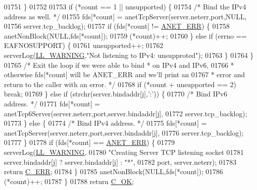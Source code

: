 \begin{DoxyCode}
{{{{{{{{{{{{{{{{{{{{{{{{{01751             \}
01752 
01753             \textcolor{keywordflow}{if} (*count == 1 || unsupported) \{
01754                 \textcolor{comment}{/* Bind the IPv4 address as well. */}
01755                 fds[*count] = anetTcpServer(server.neterr,port,NULL,
01756                     server.tcp\_backlog);
01757                 \textcolor{keywordflow}{if} (fds[*count] != \hyperlink{anet_8h_a0697b7774a7e0f4ef141839fe93536fe}{ANET\_ERR}) \{
01758                     anetNonBlock(NULL,fds[*count]);
01759                     (*count)++;
01760                 \} \textcolor{keywordflow}{else} \textcolor{keywordflow}{if} (errno == EAFNOSUPPORT) \{
01761                     unsupported++;
01762                     serverLog(\hyperlink{server_8h_a31229b9334bba7d6be2a72970967a14b}{LL\_WARNING},\textcolor{stringliteral}{"Not listening to IPv4: unsupproted"});
01763                 \}
01764             \}
01765             \textcolor{comment}{/* Exit the loop if we were able to bind * on IPv4 and IPv6,}
01766 \textcolor{comment}{             * otherwise fds[*count] will be ANET\_ERR and we'll print an}
01767 \textcolor{comment}{             * error and return to the caller with an error. */}
01768             \textcolor{keywordflow}{if} (*count + unsupported == 2) \textcolor{keywordflow}{break};
01769         \} \textcolor{keywordflow}{else} \textcolor{keywordflow}{if} (strchr(server.bindaddr[j],\textcolor{stringliteral}{':'})) \{
01770             \textcolor{comment}{/* Bind IPv6 address. */}
01771             fds[*count] = anetTcp6Server(server.neterr,port,server.bindaddr[j],
01772                 server.tcp\_backlog);
01773         \} \textcolor{keywordflow}{else} \{
01774             \textcolor{comment}{/* Bind IPv4 address. */}
01775             fds[*count] = anetTcpServer(server.neterr,port,server.bindaddr[j],
01776                 server.tcp\_backlog);
01777         \}
01778         \textcolor{keywordflow}{if} (fds[*count] == \hyperlink{anet_8h_a0697b7774a7e0f4ef141839fe93536fe}{ANET\_ERR}) \{
01779             serverLog(\hyperlink{server_8h_a31229b9334bba7d6be2a72970967a14b}{LL\_WARNING},
01780                 \textcolor{stringliteral}{"Creating Server TCP listening socket %
01781                 server.bindaddr[j] ? server.bindaddr[j] : \textcolor{stringliteral}{"*"},
01782                 port, server.neterr);
01783             \textcolor{keywordflow}{return} \hyperlink{server_8h_af98ac28d5f4d23d7ed5985188e6fb7d1}{C\_ERR};
01784         \}
01785         anetNonBlock(NULL,fds[*count]);
01786         (*count)++;
01787     \}
01788     \textcolor{keywordflow}{return} \hyperlink{server_8h_a303769ef1065076e68731584e758d3e1}{C\_OK};
}}}}}}}}}}}}}}}}}}}}}}}}}}
\end{DoxyCode}
